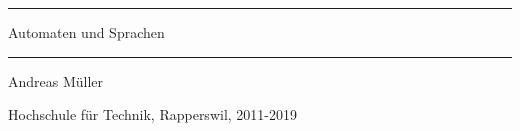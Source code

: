 \documentclass[a4paper,12pt]{book}
\begin{document}
\pagestyle{fancy}
\rhead{}
\frontmatter
\newcommand\HRule{\noindent\rule{\linewidth}{1.5pt}}
\begin{titlepage}
\HRule
\vspace*{10pt}
\begin{flushright}
{\Huge Automaten und Sprachen}
\end{flushright}
\HRule
\begin{flushright}
\vspace{30pt}
\LARGE
Andreas Müller
\end{flushright}
\begin{center}
Hochschule für Technik, Rapperswil, 2011-2019
\end{center}
\end{titlepage}
\hypersetup{
    linktoc=all,
    linkcolor=blue
}
\tableofcontents
\newtheorem{satz}{Satz}[chapter]
\newtheorem{hilfssatz}[satz]{Hilfssatz}
\newtheorem{definition}[satz]{Definition}
\newtheorem{annahme}[satz]{Annahme}
\newenvironment{beispiel}[1][Beispiel]{%
\begin{proof}[#1]%
\renewcommand{\qedsymbol}{$\bigcirc$}
}{\end{proof}}
\def\blank{\text{\textvisiblespace}}
\mainmatter
\begin{refsection}









\appendix

\vfill
\pagebreak
\ifodd\value{page}\else\null\clearpage\fi
\lhead{}
\rhead{}
\printbibliography[heading=subbibliography]
\end{refsection}


\end{document}
